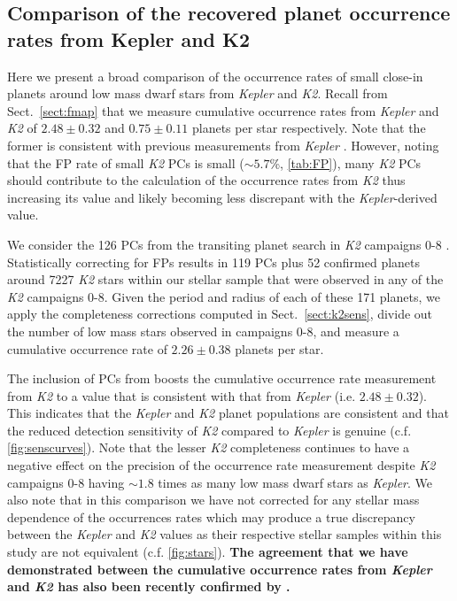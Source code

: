 \documentclass[twocolumn]{emulateapj}
\newcommand{\kepler}[1]{\emph{Kepler}#1}
\newcommand{\ktwo}[1]{\emph{K2}#1}
\begin{document}
\subsection{Comparison of the recovered planet occurrence rates from Kepler and K2} \label{sect:comparef}
Here we present a broad comparison of the occurrence rates of small close-in planets around
low mass dwarf stars from \kepler{} and \ktwo{.} Recall from Sect.~\ref{sect:fmap} that
we measure cumulative occurrence rates from \kepler{} and \ktwo{} of 
$2.48\pm 0.32$ and $0.75\pm 0.11$ planets per star respectively. Note that the former is consistent with
previous measurements from \kepler{} \citep{morton14,dressing15a,gaidos16}. However, noting that 
the FP rate of small \ktwo{} PCs is small ($\sim 5.7$\%, \autoref{tab:FP}), many \ktwo{} PCs should contribute
to the calculation of the occurrence rates from \ktwo{} thus increasing its value and likely becoming less
discrepant with the \kepler{-}derived value.

We consider the 126 PCs from the transiting planet search in \ktwo{} campaigns 0-8 \citep{kruse19}.
Statistically correcting
for FPs results in 119 PCs plus 52 confirmed planets around 7227 \ktwo{} stars within our stellar sample that
were observed in any of the \ktwo{} campaigns 0-8. Given the period and radius of each of these 171 planets,
we apply the completeness corrections computed in Sect.~\ref{sect:k2sens}, divide out the number of low mass stars
observed in campaigns 0-8, and measure a cumulative occurrence rate of $2.26\pm 0.38$ planets per star.

The inclusion
of PCs from \cite{kruse19} boosts the cumulative occurrence rate measurement from \ktwo{} to a value that is
consistent with that from \kepler{} (i.e. $2.48\pm 0.32$). This indicates that the \kepler{} and
\ktwo{} planet populations are consistent and that the reduced detection sensitivity of \ktwo{} compared to
\kepler{} is genuine (c.f. \autoref{fig:senscurves}). Note that the lesser \ktwo{} completeness continues to
have a negative
effect on the precision of the occurrence rate measurement despite \ktwo{} campaigns 0-8 having $\sim 1.8$ times
as many low mass dwarf stars as \kepler{.} We also note that in this comparison we have not corrected for any stellar
mass dependence of the occurrences rates which may produce a true discrepancy between the \kepler{} and \ktwo{}
values as their respective stellar samples within this study are not equivalent (c.f. \autoref{fig:stars}).  
\textbf{The agreement that we have demonstrated between the cumulative occurrence rates from \kepler{} and \ktwo{}
has also been recently confirmed by \cite{zink20}.}
\end{document}
